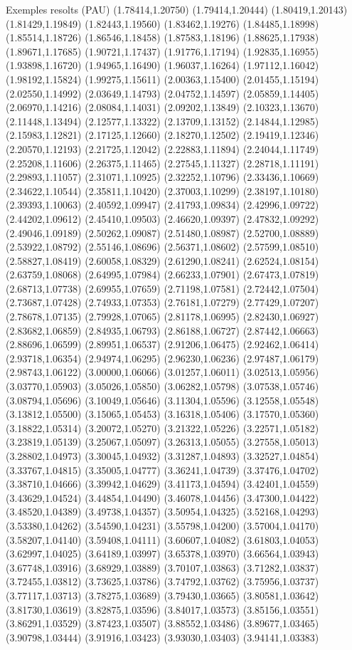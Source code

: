 \documentclass[11pt,a4paper]{article}
\begin{document}
\begin{fmex}{Exemples resolts (PAU)}
(1.78414,1.20750) (1.79414,1.20444) (1.80419,1.20143) (1.81429,1.19849) (1.82443,1.19560) (1.83462,1.19276) (1.84485,1.18998) (1.85514,1.18726) (1.86546,1.18458) (1.87583,1.18196) (1.88625,1.17938) (1.89671,1.17685) (1.90721,1.17437) (1.91776,1.17194) (1.92835,1.16955) (1.93898,1.16720) (1.94965,1.16490) (1.96037,1.16264) (1.97112,1.16042) (1.98192,1.15824) (1.99275,1.15611) (2.00363,1.15400) (2.01455,1.15194) (2.02550,1.14992) (2.03649,1.14793) (2.04752,1.14597) (2.05859,1.14405) (2.06970,1.14216) (2.08084,1.14031) (2.09202,1.13849) (2.10323,1.13670) (2.11448,1.13494) (2.12577,1.13322) (2.13709,1.13152) (2.14844,1.12985) (2.15983,1.12821) (2.17125,1.12660) (2.18270,1.12502) (2.19419,1.12346) (2.20570,1.12193) (2.21725,1.12042) (2.22883,1.11894) (2.24044,1.11749) (2.25208,1.11606) (2.26375,1.11465) (2.27545,1.11327) (2.28718,1.11191) (2.29893,1.11057) (2.31071,1.10925) (2.32252,1.10796) (2.33436,1.10669) (2.34622,1.10544) (2.35811,1.10420) (2.37003,1.10299) (2.38197,1.10180) (2.39393,1.10063) (2.40592,1.09947) (2.41793,1.09834) (2.42996,1.09722) (2.44202,1.09612) (2.45410,1.09503) (2.46620,1.09397) (2.47832,1.09292) (2.49046,1.09189) (2.50262,1.09087) (2.51480,1.08987) (2.52700,1.08889) (2.53922,1.08792) (2.55146,1.08696) (2.56371,1.08602) (2.57599,1.08510) (2.58827,1.08419) (2.60058,1.08329) (2.61290,1.08241) (2.62524,1.08154) (2.63759,1.08068) (2.64995,1.07984) (2.66233,1.07901) (2.67473,1.07819) (2.68713,1.07738) (2.69955,1.07659) (2.71198,1.07581) (2.72442,1.07504) (2.73687,1.07428) (2.74933,1.07353) (2.76181,1.07279) (2.77429,1.07207) (2.78678,1.07135) (2.79928,1.07065) (2.81178,1.06995) (2.82430,1.06927) (2.83682,1.06859) (2.84935,1.06793) (2.86188,1.06727) (2.87442,1.06663) (2.88696,1.06599) (2.89951,1.06537) (2.91206,1.06475) (2.92462,1.06414) (2.93718,1.06354) (2.94974,1.06295) (2.96230,1.06236) (2.97487,1.06179) (2.98743,1.06122) (3.00000,1.06066) (3.01257,1.06011) (3.02513,1.05956) (3.03770,1.05903) (3.05026,1.05850) (3.06282,1.05798) (3.07538,1.05746) (3.08794,1.05696) (3.10049,1.05646) (3.11304,1.05596) (3.12558,1.05548) (3.13812,1.05500) (3.15065,1.05453) (3.16318,1.05406) (3.17570,1.05360) (3.18822,1.05314) (3.20072,1.05270) (3.21322,1.05226) (3.22571,1.05182) (3.23819,1.05139) (3.25067,1.05097) (3.26313,1.05055) (3.27558,1.05013) (3.28802,1.04973) (3.30045,1.04932) (3.31287,1.04893) (3.32527,1.04854) (3.33767,1.04815) (3.35005,1.04777) (3.36241,1.04739) (3.37476,1.04702) (3.38710,1.04666) (3.39942,1.04629) (3.41173,1.04594) (3.42401,1.04559) (3.43629,1.04524) (3.44854,1.04490) (3.46078,1.04456) (3.47300,1.04422) (3.48520,1.04389) (3.49738,1.04357) (3.50954,1.04325) (3.52168,1.04293) (3.53380,1.04262) (3.54590,1.04231) (3.55798,1.04200) (3.57004,1.04170) (3.58207,1.04140) (3.59408,1.04111) (3.60607,1.04082) (3.61803,1.04053) (3.62997,1.04025) (3.64189,1.03997) (3.65378,1.03970) (3.66564,1.03943) (3.67748,1.03916) (3.68929,1.03889) (3.70107,1.03863) (3.71282,1.03837) (3.72455,1.03812) (3.73625,1.03786) (3.74792,1.03762) (3.75956,1.03737) (3.77117,1.03713) (3.78275,1.03689) (3.79430,1.03665) (3.80581,1.03642) (3.81730,1.03619) (3.82875,1.03596) (3.84017,1.03573) (3.85156,1.03551) (3.86291,1.03529) (3.87423,1.03507) (3.88552,1.03486) (3.89677,1.03465) (3.90798,1.03444) (3.91916,1.03423) (3.93030,1.03403) (3.94141,1.03383) 
\end{fmex}
\end{document}

